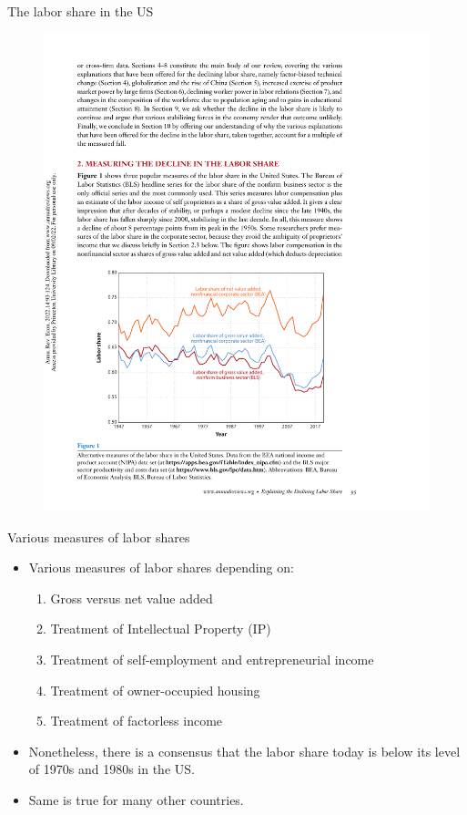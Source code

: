 \documentclass[notes=show]{beamer}
\begin{document}
\begin{frame}{The labor share in the US}
\begin{figure}[p!]
 \includegraphics[width=.9\textwidth]{figure1.pdf} 
\end{figure}
\end{frame}

\begin{frame}{Various measures of labor shares}
\begin{itemize}
\item Various measures of labor shares depending on: \medskip
\begin{enumerate}
\item Gross versus net value added \medskip
\item Treatment of Intellectual Property (IP) \medskip
\item Treatment of self-employment and entrepreneurial income \medskip
\item Treatment of owner-occupied housing \medskip
\item Treatment of factorless income
\end{enumerate} \medskip
\item Nonetheless, there is a consensus that the labor share today is below its level of 1970s and 1980s in the US. \medskip
\item Same is true for many other countries.
\end{itemize}
\end{frame}
\end{document}

